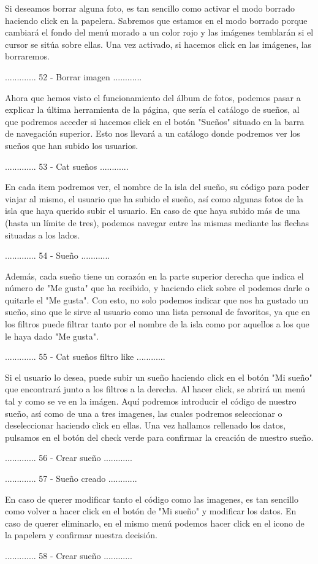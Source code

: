 Si deseamos borrar alguna foto, es tan sencillo como activar el modo borrado haciendo click en la
papelera. Sabremos que estamos en el modo borrado porque cambiará el fondo del menú morado a un color
rojo y las imágenes temblarán si el cursor se sitúa sobre ellas. Una vez activado, si hacemos click 
en las imágenes, las borraremos.

............. 52 - Borrar imagen ............

Ahora que hemos visto el funcionamiento del álbum de fotos, podemos pasar a explicar la última herramienta
de la página, que sería el catálogo de sueños, al que podremos acceder si hacemos click en el botón
"Sueños" situado en la barra de navegación superior. Esto nos llevará a un catálogo donde podremos ver
los sueños que han subido los usuarios.

............. 53 - Cat sueños ............

En cada item podremos ver, el nombre de la isla del sueño, su código para poder viajar al mismo,
el usuario que ha subido el sueño, así como algunas fotos de la isla que haya querido subir
el usuario. En caso de que haya subido más de una (hasta un límite de tres), podemos navegar
entre las mismas mediante las flechas situadas a los lados.

............. 54 - Sueño ............

Además, cada sueño tiene un corazón en la parte superior derecha que indica el número de
"Me gusta" que ha recibido, y haciendo click sobre el podemos darle o quitarle el "Me gusta".
Con esto, no solo podemos indicar que nos ha gustado un sueño, sino que le sirve al usuario
como una lista personal de favoritos, ya que en los filtros puede filtrar tanto por el nombre
de la isla como por aquellos a los que le haya dado "Me gusta".

............. 55 - Cat sueños filtro like ............

Si el usuario lo desea, puede subir un sueño haciendo click en el botón "Mi sueño" que encontrará
junto a los filtros a la derecha. Al hacer click, se abrirá un menú tal y como se ve en la imágen.
Aquí podremos introducir el código de nuestro sueño, así como de una a tres imagenes, las cuales
podremos seleccionar o deseleccionar haciendo click en ellas. Una vez hallamos rellenado los datos,
pulsamos en el botón del check verde para confirmar la creación de nuestro sueño.

............. 56 - Crear sueño ............

............. 57 - Sueño creado ............

En caso de querer modificar tanto el código como las imagenes, es tan sencillo como volver a hacer
click en el botón de "Mi sueño" y modificar los datos. En caso de querer eliminarlo, en el mismo
menú podemos hacer click en el icono de la papelera y confirmar nuestra decisión.

............. 58 - Crear sueño ............